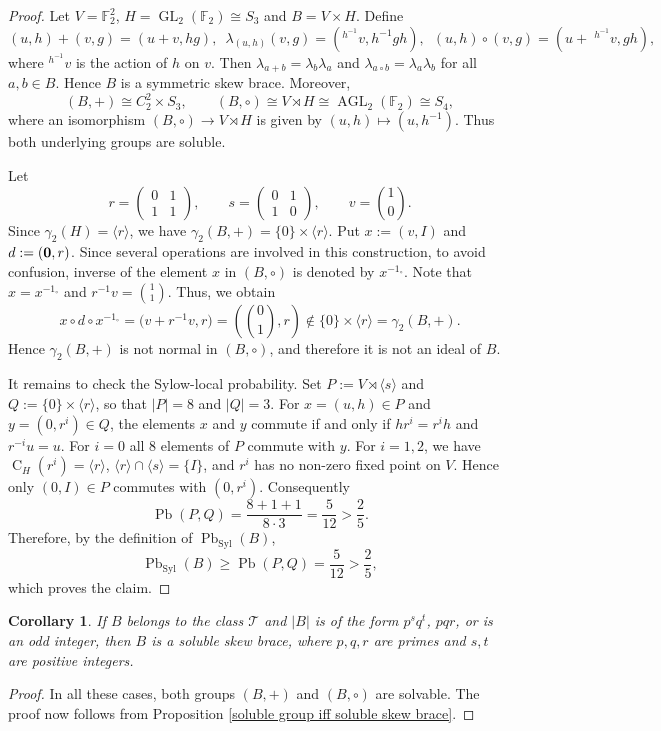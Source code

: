 \documentclass[11pt, oneside]{amsart}
\numberwithin{equation}{section}
\theoremstyle{plain}
\newtheorem{cor}[equation]{Corollary}
\theoremstyle{definition}
\newcommand{\C}{\operatorname{C} }
\newcommand{\Pb}{\operatorname{Pb} }
\newcommand{\Syl}{\operatorname{Syl} }
\begin{document}
\begin{proof}
Let $V=\mathbb F_2^2$, $H=\operatorname{GL}_2(\mathbb F_2)\cong S_3$ and $B=V\times H$. Define
$$
(u,h)+(v,g)=(u+v,hg),\,\,\,
\lambda_{(u,h)}(v,g)=(^{h^{-1}}v,h^{-1}gh),\,\,\,
(u,h)\circ(v,g)=(u+ \;^{h^{-1}}v,gh),
$$
where $^{h^{-1}}v$ is the action of $h$ on $v$.
Then $\lambda_{a+b}=\lambda_b\lambda_a$ and $\lambda_{a\circ b}=\lambda_a\lambda_b$ for all $a,b\in B$.  Hence $B$ is a symmetric skew brace. Moreover,
$$
(B,+)\cong C_2^2\times S_3,\qquad
(B,\circ)\cong V\rtimes H\cong \operatorname{AGL}_2(\mathbb F_2)\cong S_4,
$$
where an isomorphism $(B,\circ)\to V\rtimes H$ is given by $(u,h)\mapsto(u,h^{-1})$. Thus both underlying groups are soluble.

Let
$$
r=\begin{pmatrix}0&1\\1&1\end{pmatrix},\qquad
s=\begin{pmatrix}0&1\\1&0\end{pmatrix},\qquad
v=\binom10.
$$
Since $\gamma_2(H)=\langle r\rangle$, we have $\gamma_2(B,+) = \{0\}\times\langle r\rangle$. Put $x :=(v,I)$ and $d:=({\bf 0},r)$. Since several operations are involved in this construction, to avoid confusion, inverse of the element $x$ in $(B, \circ)$ is denoted by $x^{-1_{\circ}}$. Note that  $x = x^{-1_{\circ}}$ and  $r^{-1}v=\binom11$. Thus, we obtain
$$
x\circ d\circ x^{-1_\circ}
 =\bigl(v+r^{-1}v,r\bigr)
 =\left(\binom01,r\right)\notin \{0\}\times\langle r\rangle= \gamma_2(B,+).
$$
Hence $\gamma_2(B,+)$ is not normal in $(B,\circ)$, and therefore it is not an ideal of $B$.

It remains to check the Sylow-local probability. Set $P:=V\rtimes\langle s\rangle$ and $Q:=\{0\}\times\langle r\rangle$, so that $|P|=8$ and $|Q|=3$. For $x=(u,h)\in P$ and $y=(0,r^i)\in Q$, the elements $x$ and $y$ commute if and only if $hr^i=r^ih$ and $r^{-i}u=u$. For $i=0$ all $8$ elements of $P$ commute with $y$. For $i=1,2$, we have $\C_H(r^i)=\langle r\rangle$, $\langle r\rangle\cap\langle s\rangle=\{I\}$, and $r^i$ has no non-zero fixed point on $V$. Hence only $(0,I)\in P$ commutes with $(0,r^i)$. Consequently
$$
\Pb(P,Q)=\frac{8+1+1}{8\cdot3}=\frac5{12}>\frac25.
$$
Therefore, by the definition of $\Pb_{\Syl}(B)$,
$$
\Pb_{\Syl}(B)\geqslant\Pb(P,Q)=\frac5{12}>\frac25,
$$
which proves the claim.
\end{proof}



\begin{cor}
      If $B$ belongs to the class $\mathcal{T}$ and $|B|$ is of the form $p^sq^t$, $pqr$, or is an odd integer, then $B$ is a soluble skew brace, where $p,q,r$ are primes and $s, t$ are positive integers.  
\end{cor}
\begin{proof}
    In all these cases, both groups $(B,+)$ and $(B,\circ)$ are solvable. The proof now follows from Proposition \ref{soluble group iff soluble skew brace}.
\end{proof}
\end{document}
